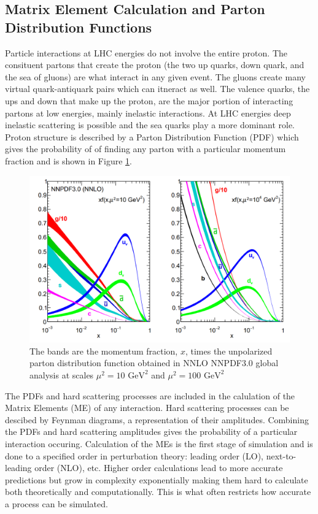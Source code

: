 \subsection{ Matrix Element Calculation and Parton Distribution Functions}

Particle interactions at LHC energies do not involve the entire proton.  The consituent partons that create the proton (the two up quarks, down quark, and the sea of gluons) are what interact in any given event.  The gluons create many virtual quark-antiquark pairs which can itneract as well.  The valence quarks, the ups and down that make up the proton, are the major portion of interacting partons at low energies, mainly inelastic interactions.  At LHC energies deep inelastic scattering is possible and the sea quarks play a more dominant role.  Proton structure is described by a Parton Distribution Function (PDF) which gives the probability of of finding any parton with a particular momentum fraction and is shown in Figure \ref{fig:PDF}.

\begin{figure}[h!]
	\centering
	\includegraphics[width=\columnwidth]{../ThesisImages/Simulation/PDF.png}
	\caption[The bands are the momentum fraction, $x$, times the unpolarized parton distribution function obtained in NNLO NNPDF3.0 global analysis at scales $\mu^2= 10$ GeV and $\mu^2 = 100 \text{ GeV}^2$]{The bands are the momentum fraction, $x$, times the unpolarized parton distribution function obtained in NNLO NNPDF3.0 global analysis at scales $\mu^2= 10 \text{ GeV}^2$ and $\mu^2 = 100 \text{ GeV}^2$ \cite{PDG2018} 
	}
	\label{fig:PDF}
\end{figure}
The PDFs and hard scattering processes are included in the calulation of the Matrix Elements (ME) of any interaction.  Hard scattering processes can be descibed by Feynman diagrams, a representation of their amplitudes.  Combining the PDFs and hard scattering amplitudes gives the probability of a particular interaction occuring.  Calculation of the MEs is the first stage of simulation and is done to a specified order in perturbation theory: leading order (LO), next-to-leading order (NLO), etc.  Higher order calculations lead to more accurate predictions but grow in complexity exponentially making them hard to calculate both theoretically and computationally.  This is what often restricts how accurate a process can be simulated.  

